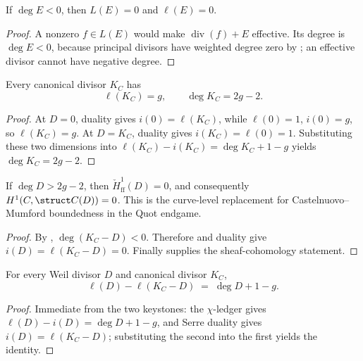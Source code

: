 \begin{lemma}
  \label{thm:adelic_negative_degree_vanishing}
  If \(\deg E<0\), then \(L(E)=0\) and \(\ell(E)=0\).
\end{lemma}
\begin{proof}
  A nonzero \(f\in L(E)\) would make
  \(\operatorname{div}(f)+E\) effective.  Its degree is \(\deg E<0\),
  because principal divisors have weighted degree zero by
  ; an effective divisor cannot
  have negative degree.
\end{proof}

\begin{theorem}
  \label{thm:adelic_canonical_degree}
  \notready
  Every canonical divisor \(K_C\) has
  \[
    \ell(K_C)=g,
    \qquad \deg K_C=2g-2.
  \]
\end{theorem}
\begin{proof}
  At \(D=0\), duality gives \(i(0)=\ell(K_C)\), while
  \(\ell(0)=1\), \(i(0)=g\), so \(\ell(K_C)=g\).  At \(D=K_C\),
  duality gives \(i(K_C)=\ell(0)=1\).  Substituting these two dimensions
  into \(\ell(K_C)-i(K_C)=\deg K_C+1-g\) yields
  \(\deg K_C=2g-2\).
\end{proof}

\begin{corollary}
[Vanishing: \(i(D) = 0\) for \(\deg D > 2g - 2\)]
  \label{thm:adelic_h1_vanishing}
  \notready
  If \(\deg D>2g-2\), then
  \(\check H^1_{\mathrm{ff}}(D)=0\), and consequently
  \(H^1(C,\struct C(D))=0\).  This is the curve-level replacement for
  Castelnuovo--Mumford boundedness in the Quot endgame.
\end{corollary}
\begin{proof}
  By , \(\deg(K_C-D)<0\).  Therefore
   and duality give
  \(i(D)=\ell(K_C-D)=0\).  Finally
   supplies the sheaf-cohomology
  statement.
\end{proof}

\begin{theorem}
  \label{thm:adelic_riemannRoch}
  \notready
  For every Weil divisor \(D\) and canonical divisor \(K_C\),
  \[
    \ell(D) - \ell(K_C - D) \;=\; \deg D + 1 - g .
  \]
\end{theorem}
\begin{proof}
  Immediate from the two keystones: the \(\chi\)-ledger
   gives
  \(\ell(D) - i(D) = \deg D + 1 - g\), and Serre duality
   gives \(i(D) = \ell(K_C - D)\);
  substituting the second into the first yields the identity.
\end{proof}
